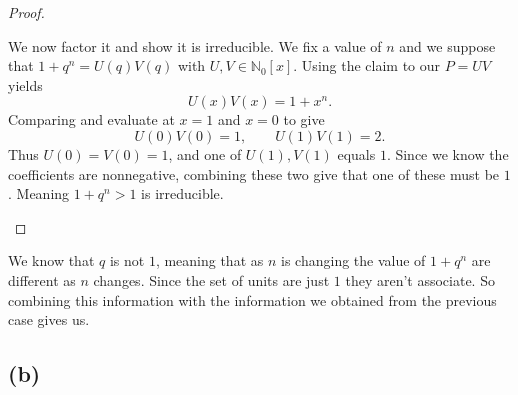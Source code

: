 \documentclass[11pt]{scrartcl}
\begin{document}
\begin{soln}
\begin{proof}
        \begin{subproof} 
			We now factor it and show it is irreducible.
			We fix a value of $n$ and we suppose that
			$1+q^n=U(q)V(q)$ with $U,V\in\mathbb N_0[x]$.
            Using the claim to our $P=UV$ yields
            \[
            U(x)V(x)=1+x^n.
            \]
            Comparing and evaluate at $x=1$ and $x=0$ to give
            \[
            U(0)V(0)=1,
            \qquad
            U(1)V(1)=2.
            \]
            Thus $U(0)=V(0)=1$, and one of $U(1),V(1)$ equals $1$. 
            Since we know the coefficients are nonnegative, combining these two give that
            one of these must be $1$. 
			Meaning $1+q^n>1$ is irreducible.
        \end{subproof}
    \end{proof}
	We know that $q$ is not $1$, meaning that as $n$ is changing the value of 
	$1+q^n$ are different as $n$ changes. Since the set of units are just $1$ they aren't associate.  
	So combining this information with the information we obtained from the previous
	case gives us.
\end{soln}

\subsection{(b)}
\end{document}
